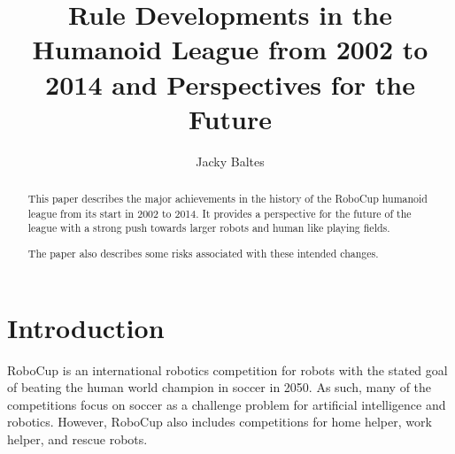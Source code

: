 \documentclass{llncs}
\begin{document}
\mainmatter

\title{Rule Developments in the Humanoid League from 2002 to 2014 and Perspectives for the Future}


\author{Jacky Baltes}


\maketitle

\begin{abstract}
This paper describes the major achievements in the history of the
RoboCup humanoid league from its start in 2002 to 2014. It provides a
perspective for the future of the league with a strong push towards
larger robots and human like playing fields.

The paper also describes some risks associated with these intended
changes.
\end{abstract}


\section{Introduction}

RoboCup is an international robotics competition for
robots with the stated goal of beating the human world champion in
soccer in 2050. As such, many of the competitions focus on soccer as a
challenge problem for artificial intelligence and robotics. However,
RoboCup also includes competitions for home helper, work helper, and
rescue robots.
\end{document}
